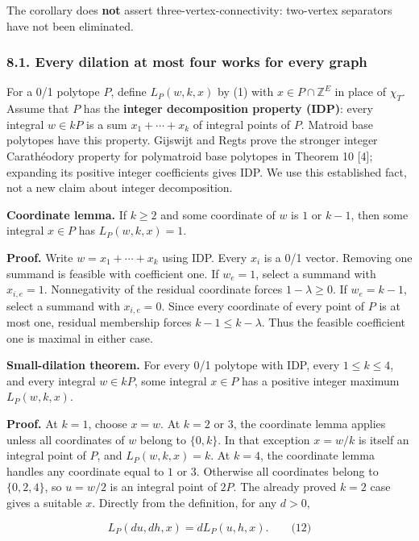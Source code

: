 \documentclass{article}
\begin{document}
The corollary does \textbf{not} assert three-vertex-connectivity: two-vertex separators have not been eliminated.

\subsubsection{8.1. Every dilation at most four works for every graph}

For a 0/1 polytope \(P\), define \(L_P(w,k,x)\) by (1) with \(x\in P\cap\mathbb Z^E\) in place of \(\chi_T\). Assume that \(P\) has the \textbf{integer decomposition property (IDP)}: every integral \(w\in kP\) is a sum \(x_1+\cdots+x_k\) of integral points of \(P\). Matroid base polytopes have this property. Gijswijt and Regts prove the stronger integer Carathéodory property for polymatroid base polytopes in Theorem 10 [4]; expanding its positive integer coefficients gives IDP. We use this established fact, not a new claim about integer decomposition.

\textbf{Coordinate lemma.} If \(k\ge2\) and some coordinate of \(w\) is \(1\) or \(k-1\), then some integral \(x\in P\) has \(L_P(w,k,x)=1\).

\textbf{Proof.} Write \(w=x_1+\cdots+x_k\) using IDP. Every \(x_i\) is a 0/1 vector. Removing one summand is feasible with coefficient one. If \(w_e=1\), select a summand with \(x_{i,e}=1\). Nonnegativity of the residual coordinate forces \(1-\lambda\ge0\). If \(w_e=k-1\), select a summand with \(x_{i,e}=0\). Since every coordinate of every point of \(P\) is at most one, residual membership forces \(k-1\le k-\lambda\). Thus the feasible coefficient one is maximal in either case.

\textbf{Small-dilation theorem.} For every 0/1 polytope with IDP, every \(1\le k\le4\), and every integral \(w\in kP\), some integral \(x\in P\) has a positive integer maximum \(L_P(w,k,x)\).

\textbf{Proof.} At \(k=1\), choose \(x=w\). At \(k=2\) or \(3\), the coordinate lemma applies unless all coordinates of \(w\) belong to \(\{0,k\}\). In that exception \(x=w/k\) is itself an integral point of \(P\), and \(L_P(w,k,x)=k\). At \(k=4\), the coordinate lemma handles any coordinate equal to \(1\) or \(3\). Otherwise all coordinates belong to \(\{0,2,4\}\), so \(u=w/2\) is an integral point of \(2P\). The already proved \(k=2\) case gives a suitable \(x\). Directly from the definition, for any \(d\gt 0\),

\[
L_P(du,dh,x)=dL_P(u,h,x).\qquad\text{(12)}
\]
\end{document}

